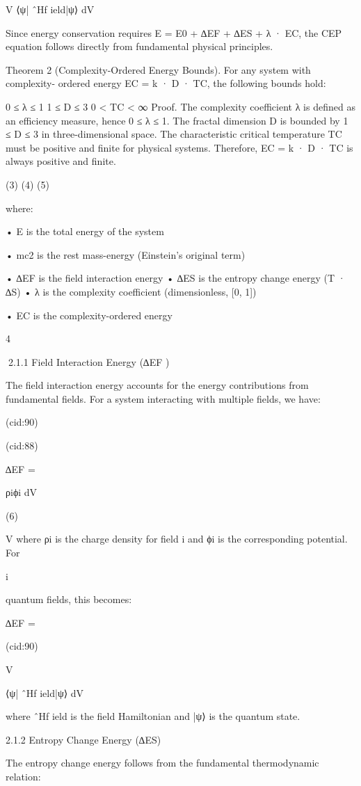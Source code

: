V ⟨ψ| ˆHf ield|ψ⟩ dV

Since energy conservation requires E = E0 + ∆EF + ∆ES + λ · EC, the CEP equation
follows directly from fundamental physical principles.

Theorem 2 (Complexity-Ordered Energy Bounds). For any system with complexity-
ordered energy EC = k · D · TC, the following bounds hold:

0 ≤ λ ≤ 1
1 ≤ D ≤ 3
0 < TC < ∞
Proof. The complexity coefficient λ is defined as an efficiency measure, hence 0 ≤ λ ≤ 1.
The fractal dimension D is bounded by 1 ≤ D ≤ 3 in three-dimensional space. The
characteristic critical temperature TC must be positive and finite for physical systems.
Therefore, EC = k · D · TC is always positive and finite.

(3)
(4)
(5)

where:

• E is the total energy of the system

• mc2 is the rest mass-energy (Einstein’s original term)

• ∆EF is the field interaction energy
• ∆ES is the entropy change energy (T · ∆S)
• λ is the complexity coefficient (dimensionless, [0, 1])

• EC is the complexity-ordered energy

4

2.1.1 Field Interaction Energy (∆EF )

The field interaction energy accounts for the energy contributions from fundamental fields.
For a system interacting with multiple fields, we have:

(cid:90)

(cid:88)

∆EF =

ρiϕi dV

(6)

V
where ρi is the charge density for field i and ϕi is the corresponding potential. For

i

quantum fields, this becomes:

∆EF =

(cid:90)

V

⟨ψ| ˆHf ield|ψ⟩ dV

where ˆHf ield is the field Hamiltonian and |ψ⟩ is the quantum state.

2.1.2 Entropy Change Energy (∆ES)

The entropy change energy follows from the fundamental thermodynamic relation:

